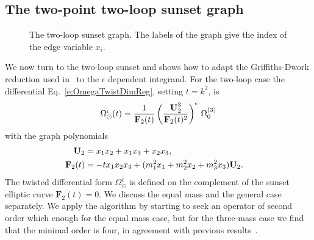 \documentclass[a4paper,12pt]{article}
\numberwithin{equation}{section}
\numberwithin{figure}{section}
\def\su{\circleddash}
\begin{document}
\subsection{The two-point  two-loop sunset graph}
\label{sec:two-loop-case}
	\begin{figure}[ht]
		\centering
		\caption{The two-loop sunset graph.  The
          labels of the graph give the index of the edge variable $x_i$.}
		  \label{fig:sunset2loop}
	\end{figure}
%
We now turn to the two-loop sunset and shows how to adapt the
Griffiths-Dwork reduction used in~\cite{Bloch:2016izu,Lairez:2022zkj} to the $\epsilon$
dependent integrand. For the two-loop case the differential
Eq.~\eqref{e:OmegaTwistDimReg}, setting $t=k^2$, is
\begin{equation}\label{e:OmegaSunset}
  \Omega_{\su}^{\epsilon}(t)={1\over
    \textbf{F}_2(t)}\left(\textbf{U}_2^3\over \textbf{F}_2(t)^2\right)^\epsilon  \,\Omega_0^{(3)}
\end{equation}
with the graph polynomials 
\begin{align}
 \textbf{U}_2&=x_1x_2+x_1x_3+x_2x_3,\cr
  \textbf{F}_2(t)&=-t x_1x_2x_3 + (m_1^2x_1+m_2^2x_2+m_3^2x_3) \textbf{U}_2.
\end{align}
%
The twisted differential form $\Omega_\su^{\epsilon}$ is defined on the
complement of the sunset elliptic curve $\mathbf{F}_2(t)=0$.
%
We discuss the equal mass and the general case separately.
We apply the algorithm by starting to seek an operator of second order which enough for the equal mass case, but for the
three-mass case we find that the minimal order is four, in
agreement with previous results~\cite{Caffo:1998du,Remiddi:2013joa,Adams:2013nia}.

\end{document}
